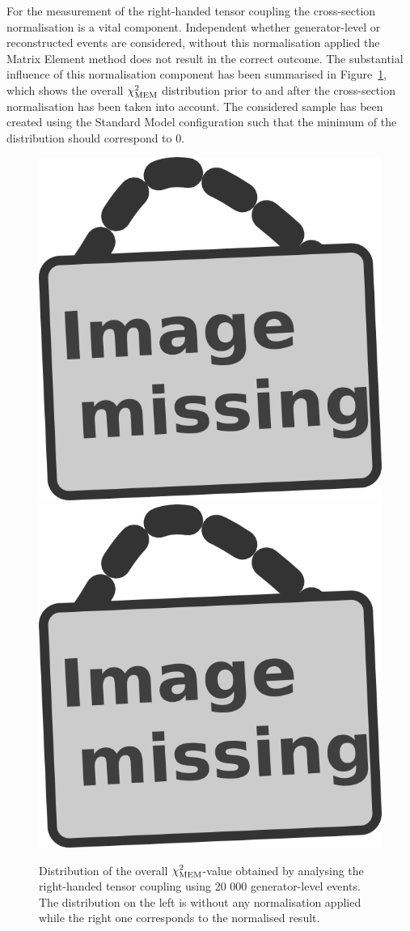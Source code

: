 For the measurement of the right-handed tensor coupling the cross-section normalisation is a vital component.
Independent whether generator-level or reconstructed events are considered, without this normalisation applied the Matrix Element method does not result in the correct outcome.
The substantial influence of this normalisation component has been summarised in Figure~\ref{fig::XSInflGen}, which shows the overall $\chi^{2}_{\textrm{MEM}}$ distribution prior to and after the cross-section normalisation has been taken into account. The considered sample has been created using the Standard Model configuration such that the minimum of the distribution should correspond to $0$.
\begin{figure}[h!t]
 \centering
 \includegraphics[width = 0.3 \textwidth]{image.png} \hspace{0.5cm}
 \includegraphics[width = 0.3 \textwidth]{image.png}
 \caption{Distribution of the overall $\chi^{2}_{\textrm{MEM}}$-value obtained by analysing the right-handed tensor coupling using 20 000 generator-level events. The distribution on the left is without any normalisation applied while the right one corresponds to the normalised result.} \label{fig::XSInflGen}
\end{figure}

